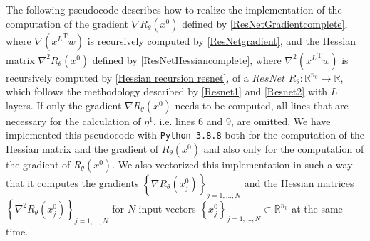 The following pseudocode describes how to realize the implementation of the computation of the gradient $\nabla R_{\theta} \left( x^0 \right)$ defined by \cref{ResNetGradientcomplete}, where $\nabla \left( {x^{L}}^{\mathrm{T}} w \right)$ is recursively computed by \cref{ResNetgradient}, and the Hessian matrix $\nabla^{2} R_{\theta} \left( x^0 \right)$ defined by \cref{ResNetHessiancomplete}, where $\nabla^2 \left( {x^{L}}^{\mathrm{T}} w \right)$ is recursively computed by \cref{Hessian recursion resnet}, of a $ResNet$ $R_{\theta} \colon \mathbb{R}^{n_0} \to \mathbb{R}$, which follows the methodology described by \cref{Resnet1} and \cref{Resnet2} with $L$ layers. If only the gradient $\nabla R_{\theta} \left( x^0 \right)$ needs to be computed, all lines that are necessary for the calculation of $\eta^1$, i.e. lines $6$ and $9$, are omitted. We have implemented this pseudocode with \lstinline!Python 3.8.8! both for the computation of the Hessian matrix and the gradient of $R_{\theta} \left( x^0 \right)$ and also only for the computation of the gradient of $R_{\theta} \left( x^0 \right)$. We also vectorized this implementation in such a way that it computes the gradients $\left\{ \nabla R_{\theta} \left(x^0_j \right) \right\}_{j=1,\ldots,N}$ and the Hessian matrices $\left\{ \nabla^2 R_{\theta} \left(x^0_j \right) \right\}_{j=1,\ldots,N}$ for $N$ input vectors $\left\{ x^0_j \right\}_{j=1,\ldots,N} \subset \mathbb{R}^{n_0}$ at the same time. 
